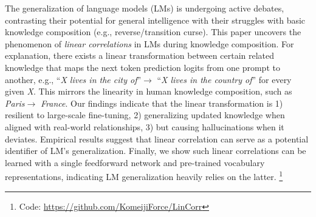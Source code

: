 The generalization of language models (LMs) is undergoing active debates, contrasting their potential for general intelligence with their struggles with basic knowledge composition (e.g., reverse/transition curse).
This paper uncovers the phenomenon of \emph{linear correlations} in LMs during knowledge composition. 
For explanation, there exists a linear transformation between certain related knowledge that maps the next token prediction logits from one prompt to another, e.g., ``\textit{X lives in the city of}''$\rightarrow$ ``\textit{X lives in the country of}'' for every given \textit{X}. 
This mirrors the linearity in human knowledge composition, such as \textit{Paris}$\rightarrow$ \textit{France}. 
Our findings indicate that the linear transformation is 1) resilient to large-scale fine-tuning, 2) generalizing updated knowledge when aligned with real-world relationships, 3) but causing hallucinations when it deviates. 
Empirical results suggest that linear correlation can serve as a potential identifier of LM's generalization. 
Finally, we show such linear correlations can be learned with a single feedforward network and pre-trained vocabulary representations, indicating LM generalization heavily relies on the latter. \footnote{Code: \href{https://github.com/KomeijiForce/LinCorr}{https://github.com/KomeijiForce/LinCorr}}



